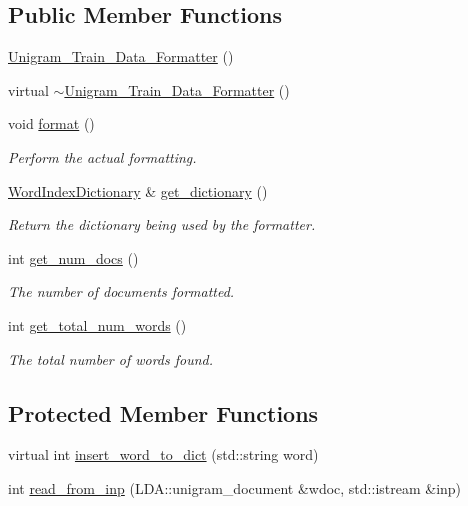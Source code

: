 \subsection*{Public Member Functions}
\begin{DoxyCompactItemize}
\item 
\hyperlink{class_unigram___train___data___formatter_aa068bb8b734f2401dba5a360120a8f33}{Unigram\_\-Train\_\-Data\_\-Formatter} ()
\item 
virtual \hyperlink{class_unigram___train___data___formatter_ac28f8c1217e864043d34094fde2bcad5}{$\sim$Unigram\_\-Train\_\-Data\_\-Formatter} ()
\item 
void \hyperlink{class_unigram___train___data___formatter_a36638dccaf14cf8ab597a3f8f0694cfe}{format} ()
\begin{DoxyCompactList}\small\item\em Perform the actual formatting. \item\end{DoxyCompactList}\item 
\hyperlink{class_word_index_dictionary}{WordIndexDictionary} \& \hyperlink{class_unigram___train___data___formatter_ab406933ef119074cab682cb07c9078b4}{get\_\-dictionary} ()
\begin{DoxyCompactList}\small\item\em Return the dictionary being used by the formatter. \item\end{DoxyCompactList}\item 
int \hyperlink{class_unigram___train___data___formatter_afbc58721bb9c38bdcd2684ef048b6807}{get\_\-num\_\-docs} ()
\begin{DoxyCompactList}\small\item\em The number of documents formatted. \item\end{DoxyCompactList}\item 
int \hyperlink{class_unigram___train___data___formatter_a89a89ebbf1d42f49f4e2f86307d47bb8}{get\_\-total\_\-num\_\-words} ()
\begin{DoxyCompactList}\small\item\em The total number of words found. \item\end{DoxyCompactList}\end{DoxyCompactItemize}
\subsection*{Protected Member Functions}
\begin{DoxyCompactItemize}
\item 
virtual int \hyperlink{class_unigram___train___data___formatter_a0023886209f7fd1441a256238c86844a}{insert\_\-word\_\-to\_\-dict} (std::string word)
\item 
int \hyperlink{class_unigram___train___data___formatter_ac4ef66ddab566b3293bdb659e8ac8c58}{read\_\-from\_\-inp} (LDA::unigram\_\-document \&wdoc, std::istream \&inp)
\end{DoxyCompactItemize}
